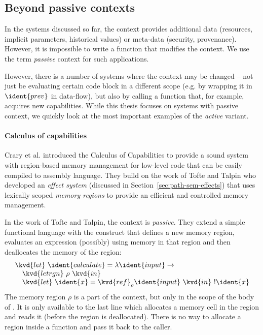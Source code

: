 
\subsection{Beyond passive contexts}

In the systems discussed so far, the context provides additional data (resources, implicit 
parameters, historical values) or meta-data (security, provenance). However, it is impossible to
write a function that modifies the context. We use the term \emph{passive} context for such 
applications. 

However, there is a number of systems where the context may be changed -- not just be evaluating
certain code block in a different scope (e.g. by wrapping it in $\ident{prev}$ in data-flow), but
also by calling a function that, for example, acquires new capabilities. While this thesis focuses
on systems with passive context, we quickly look at the most important examples of the 
\emph{active} variant.


\paragraph{Calculus of capabilities}
Crary et al. \cite{app-capabilities} introduced the Calculus of Capabilities to provide 
a sound system with region-based memory management for low-level code that can be easily 
compiled to assembly language. They build on the work of Tofte and Talpin \cite{app-region-memory}
who developed an \emph{effect system} (discussed in Section~\ref{sec:path-sem-effects}) that uses
lexically scoped \emph{memory regions} to provide an efficient and controlled memory management.

In the work of Tofte and Talpin, the context is \emph{passive}. They extend a simple functional language
with the  construct that defines a new memory region, evaluates an expression (possibly)
using memory in that region and then deallocates the memory of the region:
%
\begin{equation*}
\begin{array}{l}
\kvd{let}~\ident{calculate} = \lambda \ident{input} \rightarrow\\
\quad\kvd{letrgn}~\rho~\kvd{in}\\
\quad\kvd{let}~\ident{x} = \kvd{ref}_\rho \ident{input}~\kvd{in}~!\ident{x}
\end{array}
\end{equation*}
%
The memory region $\rho$ is a part of the context, but only in the scope of the body of 
. It is only available to the last line which allocates a memory cell in the region
and reads it (before the region is deallocated). There is no way to allocate a region inside a 
function and pass it back to the caller.

